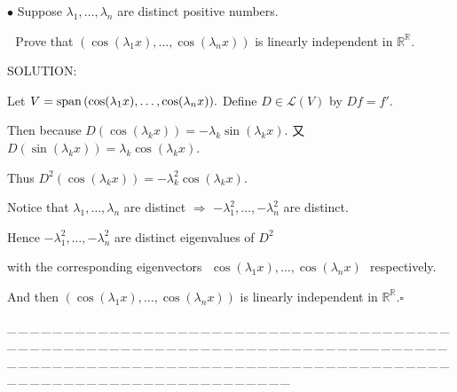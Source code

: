 \documentclass[a4paper, 11pt, UTF8]{article}
\def\Spn{\textup{span}\,}
\def\Lm{\mathcal{L}}
\def\Rbb{\mathbb{R}}
\begin{document}
\begin{large}
{\small $\bullet$} {\timessl\Large 
Suppose $\lambda_1,\dots,\lambda_n$ are distinct positive numbers. }\par\,\,
{\timessl\Large Prove that $(\cos(\lambda_1 x),\dots,\cos(\lambda_n x))$ is linearly independent in $\Rbb^\Rbb.$
}\par
{\timesbf S\footnotesize{OLUTION:}}\par\quad
Let $V=\Spn(\cos(\lambda_1 x),\dots,\cos(\lambda_n x)).$ Define $D\in\Lm(V)$ by $Df=f'.$\par\quad
Then because $D(\cos(\lambda_k x))=-\lambda_k\sin(\lambda_k x).$ 又 $D(\sin(\lambda_k x))=\lambda_k\cos(\lambda_k x).$\par\quad
Thus $D^2(\cos(\lambda_k x))=-\lambda_k^2\cos(\lambda_k x).$\par\quad
Notice that $\lambda_1,\dots,\lambda_n$ are distinct $\Rightarrow$ $-\lambda_1^2,\dots,-\lambda_n^2$ are distinct.\par\quad
Hence $-\lambda_1^2,\dots,-\lambda_n^2$ are distinct eigenvalues of $D^2$\par\qquad\qquad\quad
with the corresponding eigenvectors \,\,$\cos(\lambda_1 x),\dots,\cos(\lambda_n x)$\,\, respectively.\par\quad
And then $(\cos(\lambda_1 x),\dots,\cos(\lambda_n x))$ is linearly independent in $\Rbb^\Rbb$.\quad$\square$\par
{\tiny \_\,\_\,\_\,\_\,\_\,\_\,\_\,\_\,\_\,\_\,\_\,\_\,\_\,\_\,\_\,\_\,\_\,\_\,\_\,\_\,\_\,\_\,\_\,\_\,\_\,\_\,\_\,\_\,\_\,\_\,\_\,\_\,\_\,\_\,\_\,\_\,\_\,\_\,\_\,\_\,\_\,\_\,\_\,\_\,\_\,\_\,\_\,\_\,\_\,\_\,\_\,\_\,\_\,\_\,\_\,\_\,\_\,\_\,\_\,\_\,\_\,\_\,\_\,\_\,\_\,\_\,\_\,\_\,\_\,\_\,\_\_\,\_\,\_\,\_\,\_\,\_\,\_\,\_\,\_\,\_\,\_\,\_\,\_\,\_\,\_\,\_\,\_\,\_\,\_\,\_\,\_\,\_\,\_\,\_\,\_\,\_\,\_\,\_\,\_\,\_\,\_\,\_\,\_\,\_\,\_\,\_\,\_\,\_\,\_\,\_\,\_\,\_\,\_\,\_\,\_\,\_\,\_\,\_\,\_\,\_\,\_\,\_\,\_\,\_\,\_\,\_\,\_\,\_\,\_\,\_\,\_\,\_\,\_\,\_\,\_\,\_\,\_\,\_\,\_\,\_\,\_}\par


\end{large}
\end{document}
